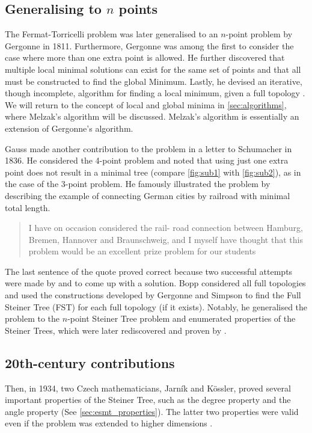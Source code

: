 \documentclass{l4proj}
\begin{document}
\subsection{Generalising to $n$ points}
\label{sec:gergonne}
The Fermat-Torricelli problem was later generalised to an $n$-point problem by Gergonne in 1811. Furthermore, Gergonne was among the first to consider the case where more than one extra point is allowed. He further discovered that multiple local minimal solutions can exist for the same set of points and that all must be constructed to find the global Minimum. Lastly, he devised an iterative, though incomplete, algorithm for finding a local minimum, given a full topology \citep{Brazil2014}. We will return to the concept of local and global minima in \ref{sec:algorithms}, where Melzak's algorithm will be discussed. Melzak's algorithm is essentially an extension of Gergonne's algorithm.

Gauss made another contribution to the problem in a letter to Schumacher in 1836. He considered the 4-point problem and noted that using just one extra point does not result in a minimal tree (compare \ref{fig:sub1} with \ref{fig:sub2}), as in the case of the 3-point problem. He famously illustrated the problem by describing the example of connecting German cities by railroad with minimal total length.
\begin{quote}
    I have on occasion considered the rail- road connection between Hamburg, Bremen, Hannover and Braunschweig, and I myself have thought that this problem would be an excellent prize problem for our students
\end{quote}

The last sentence of the quote proved correct because two successful attempts were made by \cite{Bopp} and \cite{Hoffmann} to come up with a solution. Bopp considered all full topologies and used the constructions developed by Gergonne and Simpson to find the Full Steiner Tree (FST) for each full topology (if it exists). Notably, he generalised the problem to the $n$-point Steiner Tree problem and enumerated properties of the Steiner Trees, which were later rediscovered and proven by \cite{Gilbert1968SteinerMT}.

\subsection{20th-century contributions}
Then, in 1934, two Czech mathematicians, Jarník and Kössler, proved several important properties of the Steiner Tree, such as the degree property and the angle property (See \ref{sec:esmt_properties}). The latter two properties were valid even if the problem was extended to higher dimensions \citep{Brazil2014}.
\end{document}
